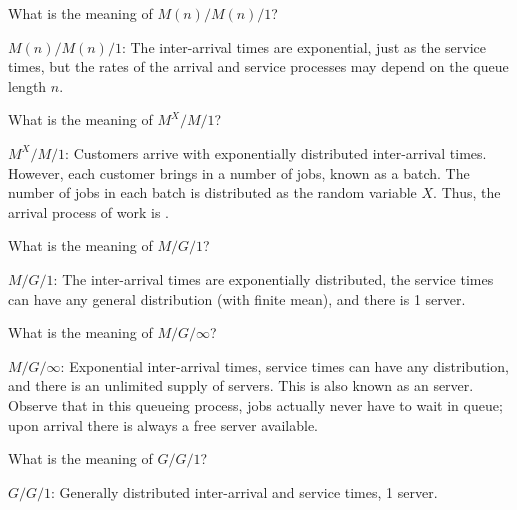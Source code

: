 \begin{exercise}[\faPhoto]
  What is the meaning of $M(n)/M(n)/1$?
  \begin{solution}
$M(n)/M(n)/1$: The inter-arrival times are exponential, just as
  the service times, but the rates of the arrival and service processes
  may depend on the queue length $n$. 
  \end{solution}
\end{exercise}


\begin{exercise}[\faPhoto]
  What is the meaning of $M^X/M/1$?
  \begin{solution}
 $M^X/M/1$: Customers arrive with exponentially distributed
  inter-arrival times. However, each customer brings in a number of
  jobs, known as a batch. The number of jobs in each batch is
  distributed as the random variable $X$. Thus, the arrival process of
  work is .
  \end{solution}
\end{exercise}

\begin{exercise}[\faPhoto]
  What is the meaning of $M/G/1$?
  \begin{solution}
$M/G/1$: The inter-arrival times are exponentially distributed,
  the service times can have any general distribution (with
  finite mean), and there is 1 server.
  \end{solution}
\end{exercise}


\begin{exercise}[\faPhoto]
  What is the meaning of $M/G/\infty$?
  \begin{solution}
 $M/G/\infty$: Exponential inter-arrival times, service times can
  have any distribution, and there is an unlimited supply of
  servers. This is also known as an  server. Observe
  that in this queueing process, jobs actually never have to wait in
  queue; upon arrival there is always a free server available.
  \end{solution}
\end{exercise}

\begin{exercise}[\faPhoto]
  What is the meaning of $G/G/1$?
  \begin{solution}
 $G/G/1$: Generally distributed inter-arrival and service times, 1 server.
  \end{solution}
\end{exercise}

